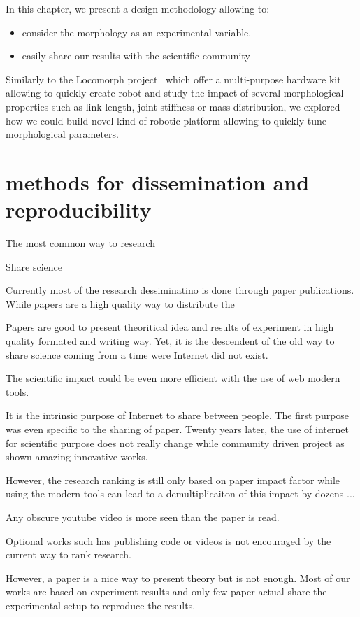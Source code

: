 In this chapter, we present a design methodology allowing to:
\begin{itemize}
    \item consider the morphology as an experimental variable.
    \item easily share our results with the scientific community
\end{itemize}


Similarly to the Locomorph project~\cite{locomorph} which offer a multi-purpose hardware kit allowing to quickly create robot and study the impact of several morphological properties such as link length, joint stiffness or mass distribution, we explored how we could build novel kind of robotic platform allowing to quickly tune morphological parameters.

\section{methods for dissemination and reproducibility} %

The most common way to  research

Share science

Currently most of the research dessiminatino is done through paper publications.
While papers are a high quality way to distribute the

Papers are good to present theoritical idea and results of experiment in high quality formated and writing way.
Yet, it is the descendent of the old way to share science coming from a time were Internet did not exist.

The scientific impact could be even more efficient with the use of web modern tools.

It is the intrinsic purpose of Internet to share between people.
The first purpose was even specific to the sharing of paper.
Twenty years later, the use of internet for scientific purpose does not really change while community driven project as shown amazing innovative works.

However, the research ranking is still only based on paper impact factor while using the modern tools can lead to a demultiplicaiton of this impact by dozens ...

Any obscure youtube video is more seen than the paper is read.

Optional works such has publishing code or videos is not encouraged by the current way to rank research.

However, a paper is a nice way to present theory but is not enough.
Most of our works are based on experiment results and only few paper actual share the experimental setup to reproduce the results.

